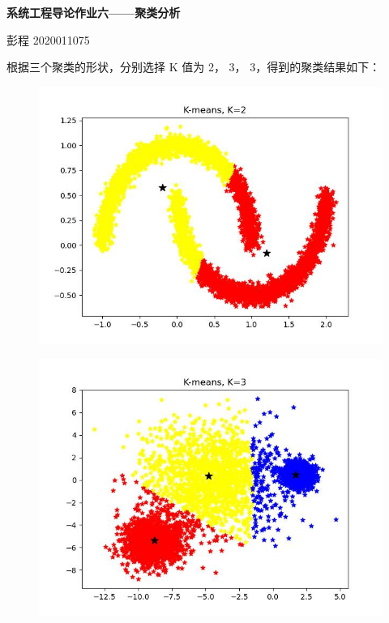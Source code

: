 \documentclass[UTF8]{ctexart}
\begin{document}
\begin{center}
  \textbf{\LARGE{系统工程导论作业六——聚类分析}}\\
\end{center}
\begin{center}
  \large{彭程 2020011075}
\end{center}


\noindent \textbf{}

\noindent \textbf{}

根据三个聚类的形状，分别选择 K 值为 2， 3， 3，得到的聚类结果如下：

\begin{figure}[H]
  \centering
  \includegraphics[scale=0.46]{no1.jpg}
\end{figure}

\begin{figure}[H]
  \centering
  \includegraphics[scale=0.46]{no2.jpg}
\end{figure}
\end{document}
